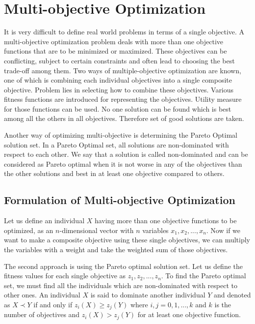 \section{Multi-objective Optimization}
\label {sec:mult_op}
It is very difficult to define real world problems in terms of a single objective. A multi-objective optimization problem deals with more than one objective functions that are to be minimized or maximized. These objectives can be conflicting, subject to certain constraints and often lead to choosing the best trade-off among them. Two ways of multiple-objective optimization are known, one of which is combining each individual objectives into a single composite objective. Problem lies in selecting how to combine these objectives.  Various fitness functions are introduced for representing the objectives. Utility measure for those functions can be used. No one solution can be found which is best among all the others in all objectives. Therefore set of good solutions are taken.

Another way of optimizing multi-objective is determining the Pareto Optimal solution set. In a Pareto Optimal set, all solutions are non-dominated with respect to each other.  We say that a solution is called non-dominated and can be considered as Pareto optimal when it is not worse in any of the objectives than the other solutions and best in at least one objective compared to others. 

\subsection{Formulation of Multi-objective Optimization}
Let us define an individual $X$ having more than one objective functions to be optimized, as an $n$-dimensional vector with $n$ variables $x_1, x_2,..., x_n$. Now if we want to make a composite objective using these single objectives, we can multiply the variables with a weight and take the weighted sum of those objectives. 

The second approach is using the Pareto optimal solution set. Let us define the fitness values for each single objective as $z_1, z_2,..., z_n$. To find the Pareto optimal set, we must find all the individuals which are non-dominated with respect to other ones. An individual $X$ is said to dominate another individual $Y$ and denoted as $X \prec Y$ if and only if $z_i(X) \geq z_j(Y)$ where $i,j= 0,1,..., k$ and $k$ is the number of objectives and $z_i(X) > z_j(Y)$ for at least one objective function.

